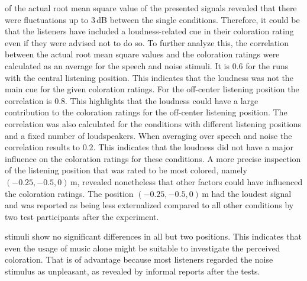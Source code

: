  of the actual root mean square value of the presented signals
revealed that there were fluctuations up to $3$\,dB between the single
conditions. Therefore, it could be that the listeners have included a
loudness-related cue in their coloration rating even if they were advised not to
do so.
To further analyze this, the correlation between the actual root mean square
values and the coloration ratings were calculated as an average for the speech
and noise stimuli. It is $0.6$ for the runs with the central listening position.
This indicates that the loudness was not the main cue for the given coloration
ratings. For the off-center listening position the correlation is $0.8$.
This highlights that the loudness could have a large contribution to the
coloration ratings for the off-center listening position.
The correlation was also calculated for the conditions with different listening
positions and a fixed number of loudspeakers. When averaging over speech and
noise the correlation results to $0.2$.
This 
indicates that the loudness did not have a major influence on the coloration ratings
for these conditions.
A more precise inspection of the listening position that was rated to be
most colored, namely $(-0.25,-0.5,0)$\,m, revealed
nonetheless that other factors could have influenced the coloration ratings.
The position $(-0.25,-0.5,0)$\,m had the loudest signal and was reported as
being less externalized compared to all other conditions by two test
participants after the experiment.

 stimuli show no significant differences in all but two
positions. This indicates that even the usage of music alone might
be suitable to investigate the perceived coloration. That is of advantage
because most listeners regarded the noise stimulus as unpleasant, as revealed by
informal reports after the tests.


